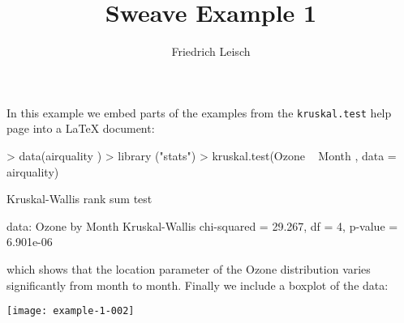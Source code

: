 \documentclass[a4paper ]{ article}
\title{Sweave  Example  1}
\author{Friedrich  Leisch}
\begin{document}

\maketitle
In this  example  we embed  parts of the  examples  from  the
\texttt{kruskal.test} help  page  into a \LaTeX {}  document:
\begin{Schunk}
\begin{Sinput}
> data(airquality )
> library ("stats")
> kruskal.test(Ozone ~ Month , data = airquality)
\end{Sinput}
\begin{Soutput}
	Kruskal-Wallis rank sum test

data:  Ozone by Month
Kruskal-Wallis chi-squared = 29.267, df = 4, p-value = 6.901e-06
\end{Soutput}
\end{Schunk}
which  shows  that  the  location  parameter  of the  Ozone
distribution  varies  significantly  from  month to month. Finally  we
include a boxplot  of the  data:
\begin{center}
\texttt{[image: example-1-002]}
\end{center}
\end{document}
